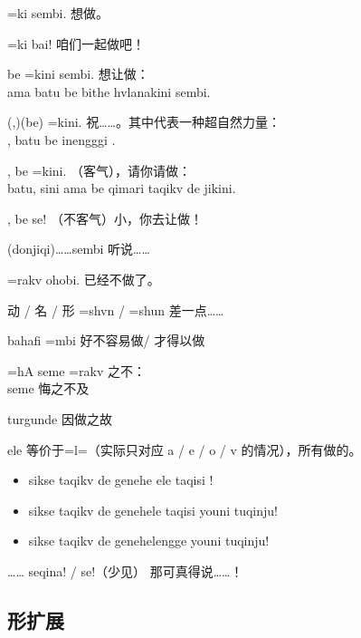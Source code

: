 \begin{des}
    \begin{des}
        \item[\A \V=ki sembi.] \A 想做\V 。
        \item[\V=ki bai!] 咱们一起做\V 吧！ 
        \item[\A \B be \V=kini sembi.] \A 想让\V 做\V ：\\
            ama batu be bithe hvlanakini sembi.
        \item[(\A ,)(\B be) \V=kini.] 祝\B ……。其中\A 代表一种超自然力量：\\
            , batu be  inengggi .
        \item[\A , \B be \V=kini.] （客气）\A ，请你请\B 做\V ：\\
            batu, sini ama be qimari taqikv de jikini.
        \item[\A , \B be \V\ftn{命} se!] （不客气）小\A ，你去让\B 做\V ！
        \item[(donjiqi)……sembi] 听说……
    \end{des}
    \item[\V=rakv ohobi.] 已经不做\V 了。
    \item[动 / 名 / 形 =shvn / =shun] 差一点……
    \item[bahafi \V=mbi] 好不容易做\V / 才得以做\V 
    \item[\V\ftn{1}=hA seme \V\ftn{2}=rakv] \V{}之不\V{}：\\
         seme  悔之不及 
    \item[\V\ftn{形} turgunde] 因做\V 之故
    \item[\V\ftn{形} ele] 等价于\V=l=\AIfina （实际只对应 a / e / o / v 的情况），所有做\V 的。
    \begin{itemize}
        \item sikse taqikv de genehe ele taqisi  !
        \item sikse taqikv de genehele taqisi youni tuqinju!
        \item sikse taqikv de genehelengge youni tuqinju!
    \end{itemize}
    \item[…… seqina! / se!（少见）] 那可真得说……！ 
\end{des}
 
\subsection{形扩展}

